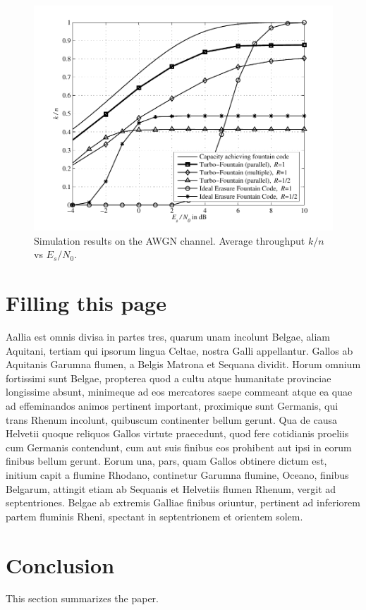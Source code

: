 \documentclass[journal, a4paper]{IEEEtran}
\begin{document}
    \begin{figure}[!hbt]
        \begin{center}
        \includegraphics[width=\columnwidth]{plot_tf}
        \caption{Simulation results on the AWGN channel. Average throughput $k/n$ vs $E_s/N_0$.}
        \label{fig:tf_plot}
        \end{center}
    \end{figure}

\section{Filling this page}
    Aallia est omnis divisa in partes tres, quarum unam incolunt Belgae, aliam Aquitani, tertiam qui ipsorum lingua Celtae, nostra Galli appellantur. Gallos ab Aquitanis Garumna flumen, a Belgis Matrona et Sequana dividit. Horum omnium fortissimi sunt Belgae, propterea quod a cultu atque humanitate provinciae longissime absunt, minimeque ad eos mercatores saepe commeant atque ea quae ad effeminandos animos pertinent important, proximique sunt Germanis, qui trans Rhenum incolunt, quibuscum continenter bellum gerunt. Qua de causa Helvetii quoque reliquos Gallos virtute praecedunt, quod fere cotidianis proeliis cum Germanis contendunt, cum aut suis finibus eos prohibent aut ipsi in eorum finibus bellum gerunt. Eorum una, pars, quam Gallos obtinere dictum est, initium capit a flumine Rhodano, continetur Garumna flumine, Oceano, finibus Belgarum, attingit etiam ab Sequanis et Helvetiis flumen Rhenum, vergit ad septentriones. Belgae ab extremis Galliae finibus oriuntur, pertinent ad inferiorem partem fluminis Rheni, spectant in septentrionem et orientem solem.

\section{Conclusion}
    This section summarizes the paper.
\nocite{5}



\end{document}
